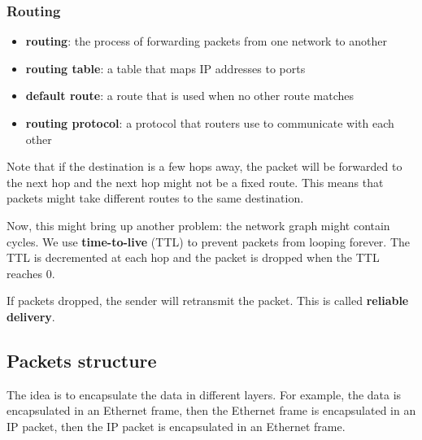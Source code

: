 \documentclass[letterpaper,12pt]{article}
\begin{document}
\subsubsection{Routing}
\begin{itemize}
    \item \textbf{routing}: the process of forwarding packets from one network to another
    \item \textbf{routing table}: a table that maps IP addresses to ports
    \item \textbf{default route}: a route that is used when no other route matches
    \item \textbf{routing protocol}: a protocol that routers use to communicate with each other
\end{itemize}
Note that if the destination is a few hops away, the packet will be forwarded to the next hop and the next hop might not be a fixed route. This means that packets might take different routes to the same destination.

Now, this might bring up another problem: the network graph might contain cycles. We use \textbf{time-to-live} (TTL) to prevent packets from looping forever. The TTL is decremented at each hop and the packet is dropped when the TTL reaches 0.

If packets dropped, the sender will retransmit the packet. This is called \textbf{reliable delivery}.
\subsection{Packets structure}
The idea is to encapsulate the data in different layers. For example, the data is encapsulated in an Ethernet frame, then the Ethernet frame is encapsulated in an IP packet, then the IP packet is encapsulated in an Ethernet frame.
\end{document}
